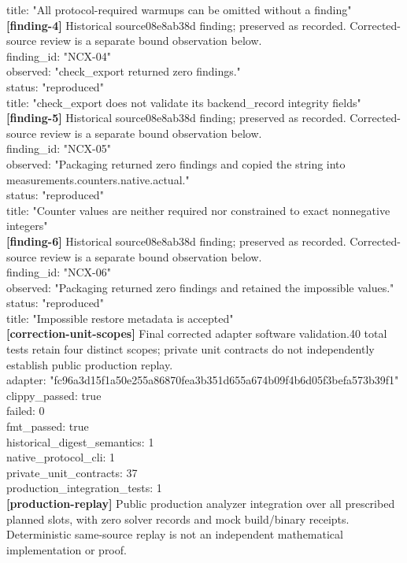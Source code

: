 \documentclass[11pt]{article}
\begin{document}
title: "All protocol-required warmups can be omitted without a finding"\\
\textbf{[finding-4]} Historical source08e8ab38d finding; preserved as recorded. Corrected-source review is a separate bound observation below.\\
finding\_id: "NCX-04"\\
observed: "check\_export returned zero findings."\\
status: "reproduced"\\
title: "check\_export does not validate its backend\_record integrity fields"\\
\textbf{[finding-5]} Historical source08e8ab38d finding; preserved as recorded. Corrected-source review is a separate bound observation below.\\
finding\_id: "NCX-05"\\
observed: "Packaging returned zero findings and copied the string into measurements.counters.native.actual."\\
status: "reproduced"\\
title: "Counter values are neither required nor constrained to exact nonnegative integers"\\
\textbf{[finding-6]} Historical source08e8ab38d finding; preserved as recorded. Corrected-source review is a separate bound observation below.\\
finding\_id: "NCX-06"\\
observed: "Packaging returned zero findings and retained the impossible values."\\
status: "reproduced"\\
title: "Impossible restore metadata is accepted"\\
\textbf{[correction-unit-scopes]} Final corrected adapter software validation.40 total tests retain four distinct scopes; private unit contracts do not independently establish public production replay.\\
adapter: "fc96a3d15f1a50e255a86870fea3b351d655a674b09f4b6d05f3befa573b39f1"\\
clippy\_passed: true\\
failed: 0\\
fmt\_passed: true\\
historical\_digest\_semantics: 1\\
native\_protocol\_cli: 1\\
private\_unit\_contracts: 37\\
production\_integration\_tests: 1\\
\textbf{[production-replay]} Public production analyzer integration over all prescribed planned slots, with zero solver records and mock build/binary receipts. Deterministic same-source replay is not an independent mathematical implementation or proof.\\
\end{document}
